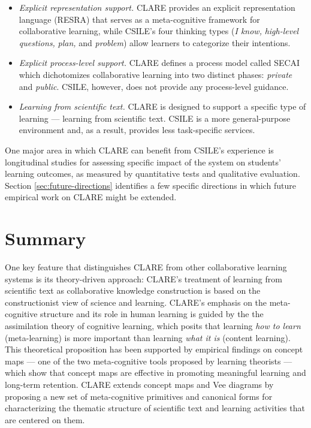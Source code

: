 \begin{itemize}
\item {\it Explicit representation support.\/} CLARE provides an explicit
  representation language (RESRA) that serves as a meta-cognitive
  framework for collaborative learning, while CSILE's four thinking types
  ({\it I know,\/} {\it high-level questions,\/} {\it plan,\/} and {\it
  problem\/}) allow learners to categorize their intentions.
  
\item {\it Explicit process-level support.\/} CLARE defines a process
  model called SECAI which dichotomizes collaborative learning into two
  distinct phases: {\it private\/} and {\it public\/}. CSILE, however,
  does not provide any process-level guidance.
  
\item {\it Learning from scientific text.\/} CLARE is designed to support
  a specific type of learning --- learning from scientific text.  CSILE
  is a more general-purpose environment and, as a result, provides less
  task-specific services.

\end{itemize}

One major area in which CLARE can benefit from CSILE's experience is
longitudinal studies for assessing specific impact of the system on
students' learning outcomes, as measured by quantitative tests and
qualitative evaluation. Section \ref{sec:future-directions} identifies a
few specific directions in which future empirical work on CLARE might be
extended.


\section{Summary}
\label{sec:c7-summary}

One key feature that distinguishes CLARE from other collaborative learning
systems is its theory-driven approach: CLARE's treatment of learning from
scientific text as collaborative knowledge construction is based on the
constructionist view of science and learning. CLARE's emphasis on the
meta-cognitive structure and its role in human learning is guided by the
the assimilation theory of cognitive learning, which posits that learning
{\it how to learn\/} (meta-learning) is more important than learning {\it
what it is\/} (content learning). This theoretical proposition has been
supported by empirical findings on concept maps --- one of the two
meta-cognitive tools proposed by learning theorists --- which show that
concept maps are effective in promoting meaningful learning and long-term
retention. CLARE extends concept maps and Vee diagrams by proposing a new
set of meta-cognitive primitives and canonical forms for characterizing the
thematic structure of scientific text and learning activities that are
centered on them.

